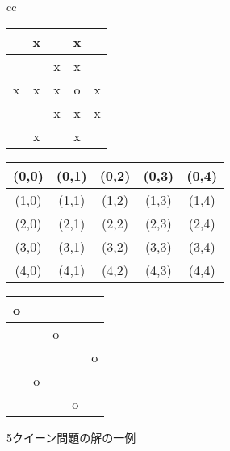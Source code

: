 \begin{figure}[htbp]
\begin{tabular}{cc}

\begin{minipage}{0.30\hsize}
\begin{center}
{\small
\begin{tabular}{|c|c|c|c|c|}
\hline
 &x& &x&\\
\hline
 & &x&x&\\
\hline
x&x&x&o&x\\
\hline
 & &x&x&x\\
\hline
 &x& &x&\\
\hline
\end{tabular}
}
\caption{"o"で示されたクイーンの動けるマス目を"x"で示している。\label{fig:tut_queen_move}}
\end{center}
\end{minipage}

\begin{minipage}{0.40\hsize}
\begin{center}
{\small
\begin{tabular}{|c|c|c|c|c|}
\hline
(0,0)&(0,1)&(0,2)&(0,3)&(0,4)\\
\hline
(1,0)&(1,1)&(1,2)&(1,3)&(1,4)\\
\hline
(2,0)&(2,1)&(2,2)&(2,3)&(2,4)\\
\hline
(3,0)&(3,1)&(3,2)&(3,3)&(3,4)\\
\hline
(4,0)&(4,1)&(4,2)&(4,3)&(4,4)\\
\hline
\end{tabular}
}
\caption{$5\times 5$のチェス盤の座標\label{fig:tut_chess}}
\end{center}
\end{minipage}

\begin{minipage}{0.25\hsize}
\begin{center}
{\small
\begin{tabular}{|c|c|c|c|c|}
\hline
o& & & &\\
\hline
 & &o& &\\
\hline
 & & & &o\\
\hline
 &o& & &\\
\hline
 & & &o&\\
\hline
\end{tabular}
}
\caption{5クイーン問題の解の一例\label{fig:tut_nqueen_sol1}}
\end{center}
\end{minipage}

\end{tabular}
\end{figure}


